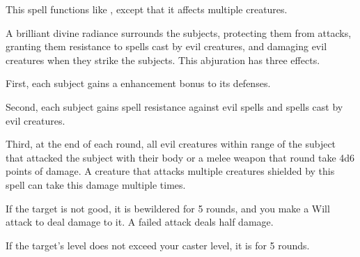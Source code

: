 \spelleffect This spell functions like , except that it affects multiple creatures.

\spelldur{\durshort \dismissable}
\spelleffect A brilliant divine radiance surrounds the subjects, protecting them from attacks, granting them resistance to spells cast by evil creatures, and damaging evil creatures when they strike the subjects. This abjuration has three effects.
\par First, each subject gains a  enhancement bonus to its defenses.
\par Second, each subject gains spell resistance against evil spells and spells cast by evil creatures.
\par Third, at the end of each round, all evil creatures within \rngclose range of the subject that attacked the subject with their body or a melee weapon that round take 4d6 points of damage. A creature that attacks multiple creatures shielded by this spell can take this damage multiple times.

\spelleffect If the target is not good, it is bewildered for 5 rounds, and you make a Will attack to deal damage to it. A failed attack deals half damage.

\spelleffect If the target's level does not exceed your caster level, it is \deafened for 5 rounds.

